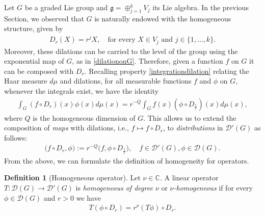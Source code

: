 \documentclass[12pt,oneside,a4paper]{book}
\numberwithin{equation}{section}     %
\theoremstyle{plain}
\theoremstyle{definition}
\newtheorem{definition}[theorem]{Definition}
\newcommand{\C}{{\mathbb C}}
\begin{document}
Let $G$ be a graded Lie group and $\mathfrak{g}=\oplus_{j=1}^{k}V_j$ its Lie algebra. In the previous Section, we observed that $G$ is naturally endowed with the homogeneous structure, given by
\begin{align*}
D_r(X)=r^j X,\quad \text{for every }X\in V_j\text{ and }j\in\{1,\dots,k\}.
\end{align*} 
Moreover, these dilations can be carried to the level of the group using the exponential map of $G$, as in \eqref{dilationonG}. Therefore, given a function $f$ on $G$ it can be composed with $D_r$. Recalling property \eqref{integrationdilation} relating the Haar measure $d\mu$ and dilations, for all measurable functions $f$ and $\phi$ on $G$, whenever the integrals exist, we have the identity
\begin{align*}
\int_G (f\circ D_r)(x)\phi(x)d\mu(x)=r^{-Q}\int_Gf(x)(\phi\circ D_{\frac{1}{r}})(x)d\mu(x),
\end{align*}     
where $Q$ is the homogeneous dimension of $G$. This allows us to extend the composition of \textit{maps} with dilations, i.e., $f\mapsto f\circ D_r$, to \textit{distributions} in $\mathcal{D}'(G)$ as follows: 
\begin{align*}
\big(f\circ D_r,\phi\big):=r^{-Q}\big(f,\phi\circ D_{\frac{1}{r}}\big),\quad f\in\mathcal{D}'(G),\phi\in\mathcal{D}(G).
\end{align*} 
From the above, we can formulate the definition of homogeneity for operators.
\begin{definition}[Homogeneous operator]
	Let $\nu\in \C$. A linear operator $T:\mathcal{D}(G)\rightarrow \mathcal{D}'(G)$ is \textit{homogeneous of degree $\nu$} or \textit{$\nu$-homogeneous} if for every $\phi\in\mathcal{D}(G)$ and $r>0$ we have
	\begin{align*}
	T(\phi\circ D_r)=r^\nu(T\phi)\circ D_r.
	\end{align*}
\end{definition}
\end{document}
